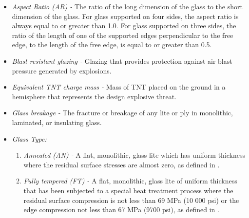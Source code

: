 \documentclass[12pt]{article}
\begin{document}
\begin{itemize}
\item \textit{Aspect Ratio (AR) -} The ratio of the long dimension of the
  glass to the short dimension of the glass.  For glass supported on four sides,
  the aspect ratio is always equal to or greater than 1.0. For glass supported
  on three sides, the ratio of the length of one of the supported edges
  perpendicular to the free edge, to the length of the free edge, is equal to or
  greater than 0.5.
  
\item \textit{Blast resistant glazing -} Glazing that provides protection 
against air blast pressure generated by explosions.

\item \textit{Equivalent TNT charge mass -} Mass of TNT placed on the ground in 
a hemisphere that represents the design explosive threat. 

\item \textit{Glass breakage -} The fracture or breakage of any lite or ply in
  monolithic, laminated, or insulating glass.  
  
\item \textit{Glass Type:}
\begin{enumerate}

\item \textit{Annealed (AN) -} A flat, monolithic, glass lite which has uniform 
thickness where the residual surface stresses are almost zero, as defined in 
\cite{ASTM2016}.

\item \textit{Fully tempered (FT) -} A flat, monolithic, glass lite of 
uniform thickness that has been subjected to a special heat treatment process 
where the residual surface compression is not less than 69 MPa (10 000 psi) or 
the edge compression not less than 67 MPa (9700 psi), as defined in \cite{ASTM2012a}.


\end{enumerate}
\end{itemize}
\end{document}
